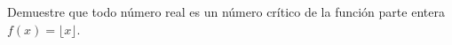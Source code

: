 \item Demuestre que todo número real es un número crítico de la función parte entera $f(x) = \lfloor x \rfloor$.
